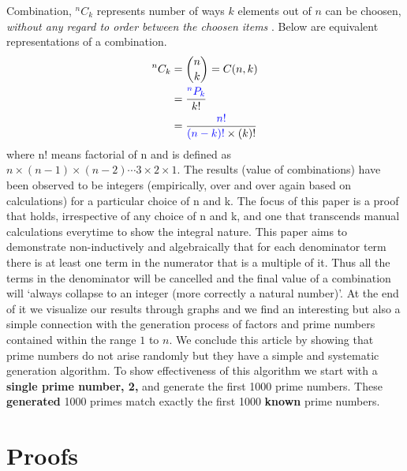 \documentclass[10pt, twoside]{article}
\newcommand*{\Permutation}[2]{{}^{#1}P_{#2}}%
\newcommand*{\Combination}[2]{{}^{#1}C_{#2}}%
\begin{document}
	 	Combination, $\Combination{n}{k}$ represents number of ways $k$ elements out of $n$ can be choosen, \textit{without any regard to order between the choosen items} \cite{PrincTechCombinatorics}. Below are equivalent representations of a combination.
	\begin{align}
	\Combination{n}{k} &= \binom{n}{k} = C(n, k)  \\
					   &= \frac{\color{blue}\Permutation{n}{k}}{k!} \label{ConnectionBetweenPermutationAndCOmbination}\\	
					   &= \frac{\color{blue}n!}{{\color{blue}(n-k)!}\times(k)!} \label{FractionalDefinitionOfCombination}
	\end{align} 
	where n! means factorial of n and is defined as $n\times(n-1)\times(n-2)\cdots3\times2\times1$. 
		The results (value of combinations) have been observed to be integers (empirically, over and over again based on calculations) for a particular choice of n and k. The focus of this paper is a proof that holds, irrespective of any choice of n and k, and one that transcends manual calculations everytime to show the integral nature. This paper aims to demonstrate non-inductively and algebraically that for each denominator term there is at least one term in the numerator that is a multiple of it. Thus all the terms in the denominator will be cancelled and the final value of a combination will `always collapse to an integer (more correctly a natural number)'. At the end of it we visualize our results through graphs and we find an interesting but also a simple connection with the generation process of factors and prime numbers contained within the range $1$ to $n$. We conclude this article by showing that prime numbers do not arise randomly but they have a simple and systematic generation algorithm. To show effectiveness of this algorithm we start with a \textbf{single prime number, 2,} and generate the first 1000 prime numbers. These \textbf{generated} 1000 primes match exactly the first 1000 \textbf{known} prime numbers.
	\section{Proofs}
\end{document}
